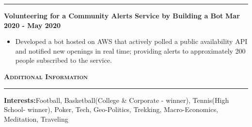 \documentclass{article}
\newcommand{\vs}{\vspace{0.3cm}}
\begin{document}
\noindent \rule[3pt]{\textwidth}{1pt}


\noindent \textbf{Volunteering for a Community Alerts Service by Building a Bot} \hfill \textbf{Mar 2020 - May 2020}
\begin{itemize}
	\item Developed a bot hosted on AWS that actively polled a public availability API and notified new openings in real time; providing alerts to approximately 200 people subscribed to the service.
\end{itemize}

\vs

\noindent \textbf{\textsc{\large Additional Information}}

\noindent \rule[3pt]{\textwidth}{1pt}

\noindent \textbf{Interests:}Football, Basketball(College \& Corporate - winner), Tennis(High School- winner), Poker, Tech, Geo-Politics, Trekking, Macro-Economics, Meditation, Traveling 
\end{document}
